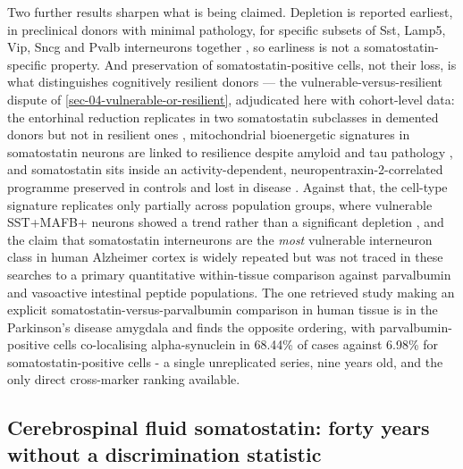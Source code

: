\documentclass[11pt]{article}
\begin{document}
Two further results sharpen what is being claimed. Depletion is reported earliest, in preclinical donors with minimal pathology, for specific subsets of Sst, Lamp5, Vip, Sncg and Pvalb interneurons together \citep{Travaglini2026}, so earliness is not a somatostatin-specific property. And preservation of somatostatin-positive cells, not their loss, is what distinguishes cognitively resilient donors --- the vulnerable-versus-resilient dispute of \ref{sec-04-vulnerable-or-resilient}, adjudicated here with cohort-level data: the entorhinal reduction replicates in two somatostatin subclasses in demented donors but not in resilient ones \citep{Castanho2025b}, mitochondrial bioenergetic signatures in somatostatin neurons are linked to resilience despite amyloid and tau pathology \citep{Cheng2025}, and somatostatin sits inside an activity-dependent, neuropentraxin-2-correlated programme preserved in controls and lost in disease \citep{Lao2025}. Against that, the cell-type signature replicates only partially across population groups, where vulnerable SST+MAFB+ neurons showed a trend rather than a significant depletion \citep{Luquez2026}, and the claim that somatostatin interneurons are the \emph{most} vulnerable interneuron class in human Alzheimer cortex is widely repeated but was not traced in these searches to a primary quantitative within-tissue comparison against parvalbumin and vasoactive intestinal peptide populations. The one retrieved study making an explicit somatostatin-versus-parvalbumin comparison in human tissue is in the Parkinson's disease amygdala and finds the opposite ordering, with parvalbumin-positive cells co-localising alpha-synuclein in 68.44\% of cases against 6.98\% for somatostatin-positive cells \citep{FloresCuadrado2017} - a single unreplicated series, nine years old, and the only direct cross-marker ranking available.

\subsection{Cerebrospinal fluid somatostatin: forty years without a discrimination statistic}
\label{sec-09-csf}
\end{document}
